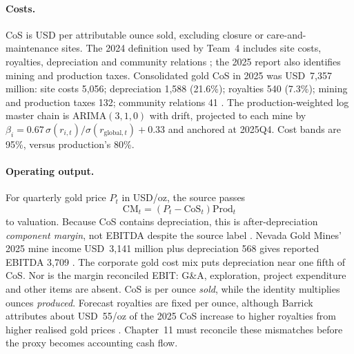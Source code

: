 \paragraph{Costs.}
CoS is USD per attributable ounce sold, excluding closure or care-and-
maintenance sites. The 2024 definition used by Team~4 includes site costs,
royalties, depreciation and community relations \cite{team4}; the 2025 report
also identifies mining and production taxes. Consolidated gold CoS in 2025
was USD~7,357 million: site costs 5,056; depreciation 1,588 (21.6\%);
royalties 540 (7.3\%); mining and production taxes 132; community relations
41 \cite{barrick-ar-2025}. The production-weighted log master chain is
ARIMA$(3,1,0)$ with drift, projected to each mine by
$\beta_i=0.67\,\sigma(r_{i,t})/\sigma(r_{\mathrm{global},t})+0.33$ and anchored
at 2025Q4. Cost bands are 95\%, versus production's 80\%.

\paragraph{Operating output.}
For quarterly gold price $P_t$ in USD/oz, the source passes
\begin{equation}
\mathrm{CM}_t=(P_t-\mathrm{CoS}_t)\mathrm{Prod}_t
\label{eq:company-component-margin}
\end{equation}
to valuation. Because CoS contains depreciation, this is after-depreciation
\emph{component margin}, not EBITDA despite the source label \cite{team4}.
Nevada Gold Mines' 2025 mine income USD~3,141 million plus depreciation 568
gives reported EBITDA 3,709 \cite{barrick-ar-2025}. The corporate gold cost
mix puts depreciation near one fifth of CoS. Nor is the margin reconciled
EBIT: G\&A, exploration, project expenditure and other items are absent.
CoS is per ounce \emph{sold}, while the identity multiplies ounces
\emph{produced}. Forecast royalties are fixed per ounce, although Barrick
attributes about USD~55/oz of the 2025 CoS increase to higher royalties from
higher realised gold prices \cite{barrick-ar-2025}. Chapter~11 must reconcile
these mismatches before the proxy becomes accounting cash flow.

